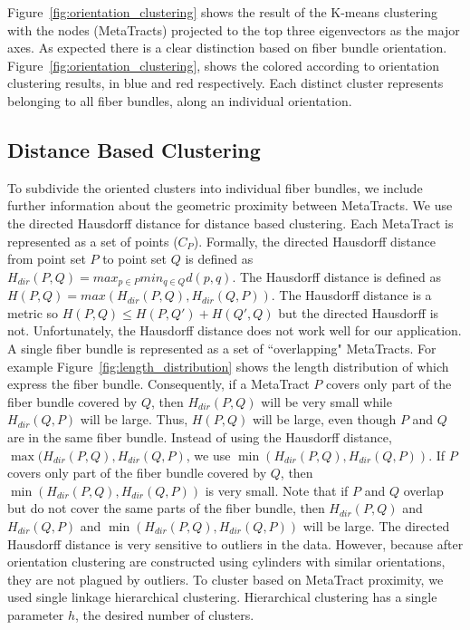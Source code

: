 Figure~\ref{fig:orientation_clustering} shows the result of the K-means clustering with the nodes (MetaTracts) projected to the top three eigenvectors as the major axes. As expected there is a clear distinction based on fiber bundle orientation. Figure~\ref{fig:orientation_clustering}, shows the \mt colored according to orientation clustering results, in blue and red respectively.
Each distinct cluster represents \mt belonging to all fiber bundles, along an individual orientation. 
\subsection{Distance Based Clustering}
\label{subsec:dist_clustering}
To subdivide the oriented clusters into individual fiber bundles, we include further information about the geometric proximity between MetaTracts. We use the directed Hausdorff distance for distance based clustering.
Each MetaTract is represented as a set of points ($C_P$). Formally, the directed Hausdorff distance from point set $P$ to point set $Q$ is defined as 
$H_{dir}(P,Q) = max_{p \in P} min_{q \in Q} d(p,q)$.
The Hausdorff distance is defined as $H(P,Q) = max(H_{dir}(P,Q),H_{dir}(Q,P))$.
The Hausdorff distance is a metric so $H(P,Q) \le H(P,Q') + H(Q',Q)$ but the directed Hausdorff is not.
%
Unfortunately, the Hausdorff distance does not work well for our application. A single fiber bundle is represented as a set of ``overlapping" MetaTracts. For example  Figure~\ref{fig:length_distribution} shows the length distribution of \mt which express the fiber bundle. Consequently, if a MetaTract $P$ covers only part of the fiber bundle covered by $Q$, then $H_{dir}(P,Q)$ will be very small while $H_{dir}(Q,P)$ will be large.
%
Thus, $H(P,Q)$ will be large, even though $P$ and $Q$ are in the same fiber bundle.
Instead of using the Hausdorff distance, $\max(H_{dir}(P,Q),H_{dir}(Q,P)$, we use $\min(H_{dir}(P,Q),H_{dir}(Q,P))$. If $P$ covers only part of the fiber bundle covered by $Q$, then $\min(H_{dir}(P,Q),H_{dir}(Q,P))$ is very small.
Note that if $P$ and $Q$ overlap but do not cover the same parts of the fiber bundle, then $H_{dir}(P,Q)$ and $H_{dir}(Q,P)$ and $\min(H_{dir}(P,Q),H_{dir}(Q,P))$ will be large.
% 
The directed Hausdorff distance is very sensitive to outliers in the data.
However, because \mt after orientation clustering are constructed using cylinders with similar orientations, they are not plagued by outliers.
To cluster based on MetaTract proximity, we used single linkage hierarchical clustering.
Hierarchical clustering has a single parameter $h$, the desired number of clusters.
